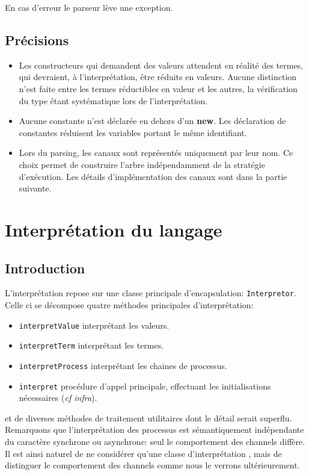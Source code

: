 \documentclass[11pt]{article} %
\begin{document}
En cas d'erreur le parseur lève une exception.

\subsection{Précisions}

\begin{itemize}
\item Les constructeurs qui demandent des valeurs attendent en réalité des termes, qui devraient, à l'interprétation, être réduits en valeurs. Aucune distinction n'est faite entre les termes réductibles en valeur et les autres, la vérification du type étant systématique lors de l'interprétation.
\item Aucune constante n'est déclarée en dehors d'un \textbf{new}. Les déclaration de constantes réduisent les variables portant le même identifiant.
\item Lors du parsing, les canaux sont représentés uniquement par leur nom. Ce choix permet de construire l'arbre indépendamment de la stratégie d'exécution. Les détails d'implémentation des canaux sont dans la partie suivante.
\end{itemize}

\section{Interprétation du langage}

\subsection{Introduction}

  L'interprétation repose sur une classe principale d'encapsulation: \texttt{Interpretor}.  Celle ci se décompose quatre méthodes principales d'interprétation: 
\begin{itemize}
  \item \texttt{interpretValue} interprétant les valeurs.
  \item \texttt{interpretTerm} interprétant les termes.
  \item \texttt{interpretProcess} interprétant les chaines de processus.
  \item \texttt{interpret} procédure d'appel principale, effectuant les initialisations nécessaires (\emph{cf infra}).
\end{itemize}

et de diverses méthodes de traitement utilitaires dont le détail serait superflu. Remarquons que l'interprétation des processus est sémantiquement indépendante du caractère synchrone ou asynchrone: seul le comportement des channels diffère. Il est ainsi naturel de ne considérer qu'une classe d'interprétation , mais de distinguer le comportement des channels comme nous le verrons ultérieurement.
\end{document}
